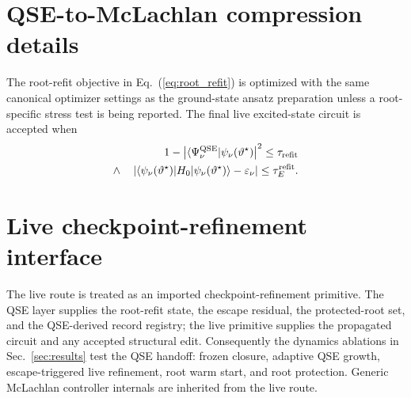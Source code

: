 \documentclass[
  reprint,
  amsmath,
  amssymb,
  aps,
  pra,
  nofootinbib,
  superscriptaddress,
  floatfix
]{revtex4-2}
\newcommand{\qse}{\mathrm{QSE}}
\newcommand{\ket}[1]{|#1\rangle}
\newcommand{\bra}[1]{\langle #1|}
\begin{document}
\section{QSE-to-McLachlan compression details}
\label{app:qse_to_mclachlan_details}

The root-refit objective in Eq.~(\ref{eq:root_refit}) is optimized with the same canonical optimizer settings as the ground-state ansatz preparation unless a root-specific stress test is being reported.  The final live excited-state circuit is accepted when
\begin{equation}
\begin{aligned}
1-
\left|
\bra{\Psi_\nu^{\qse}}\psi_\nu(\vartheta^\star)
\right|^2
\le\tau_{\rm refit}
\\
\wedge\quad
\left|
\bra{\psi_\nu(\vartheta^\star)}
H_0
\ket{\psi_\nu(\vartheta^\star)}
-\varepsilon_\nu
\right|
\le\tau_E^{\rm refit}.
\end{aligned}
\label{eq:app_refit_accept}
\end{equation}

\section{Live checkpoint-refinement interface}
\label{app:excited_dynamic_controller_details}

The live route is treated as an imported checkpoint-refinement primitive.  The QSE layer supplies the root-refit state, the escape residual, the protected-root set, and the QSE-derived record registry; the live primitive supplies the propagated circuit and any accepted structural edit.  Consequently the dynamics ablations in Sec.~\ref{sec:results} test the QSE handoff: frozen closure, adaptive QSE growth, escape-triggered live refinement, root warm start, and root protection.  Generic McLachlan controller internals are inherited from the live route.
\end{document}
